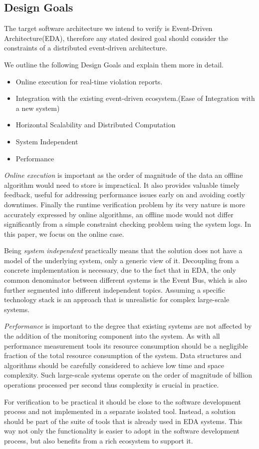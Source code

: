 \documentclass[twocolumn]{article}
\begin{document}
\subsection{Design Goals}
The target software architecture we intend to verify is Event-Driven Architecture(EDA), therefore any stated desired goal
should consider the constraints of a distributed event-driven architecture.

We outline the following Design Goals and explain them more in detail.

\begin{itemize}
	\item Online execution for real-time violation reports.
	\item Integration with the existing event-driven ecosystem.(Ease of Integration with a new system)
	\item Horizontal Scalability and Distributed Computation
	\item System Independent
	\item Performance
\end{itemize}


\par
\emph{Online execution} is important as the order of magnitude of the data an offline algorithm would need to store is impractical.
It also provides valuable timely feedback, useful for addressing performance issues early on and avoiding costly downtimes.
Finally the runtime verification problem by its very nature is more accurately expressed by online algorithms, an offline mode
would not differ significantly from a simple constraint checking problem using the system logs. In this paper, we focus on the online case.
\par
Being \emph{system independent} practically means that the solution does not have a model of the underlying system, only a generic view of it.
Decoupling from a concrete implementation is necessary, due to the fact that in EDA, the only common denominator between different systems
is the Event Bus, which is also further segmented into different independent topics. Assuming a specific technology stack is an approach that
is unrealistic for complex large-scale systems.
\par
\emph{Performance} is important to the degree that existing systems are not affected by the addition of the monitoring component into the system.
As with all performance measurement tools its resource consumption should be a negligible fraction of the total resource consumption of the system.
Data structures and algorithms should be carefully considered to achieve low time and space complexity. Such large-scale systems operate on the order
of magnitude of billion operations processed per second thus complexity is crucial in practice.
\par
For verification to be practical it should be close to the software development process and not implemented in a separate isolated tool.
Instead, a solution should be part of the suite of tools that is already used in EDA systems. This way not only the functionality is
easier to adopt in the software development process, but also benefits from a rich ecosystem to support it.
\end{document}
